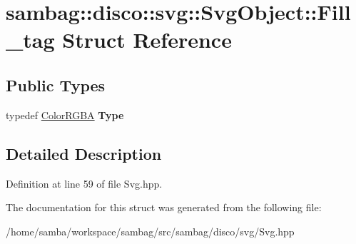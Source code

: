 \hypertarget{structsambag_1_1disco_1_1svg_1_1_svg_object_1_1_fill__tag}{
\section{sambag::disco::svg::SvgObject::Fill\_\-tag Struct Reference}
\label{structsambag_1_1disco_1_1svg_1_1_svg_object_1_1_fill__tag}
}
\subsection*{Public Types}
\begin{DoxyCompactItemize}
\item 
\hypertarget{structsambag_1_1disco_1_1svg_1_1_svg_object_1_1_fill__tag_a66e97b3cad6eaf308ef4e906a0c54366}{
typedef \hyperlink{structsambag_1_1com_1_1_color_r_g_b_a}{ColorRGBA} {\bfseries Type}}
\label{structsambag_1_1disco_1_1svg_1_1_svg_object_1_1_fill__tag_a66e97b3cad6eaf308ef4e906a0c54366}

\end{DoxyCompactItemize}


\subsection{Detailed Description}


Definition at line 59 of file Svg.hpp.



The documentation for this struct was generated from the following file:\begin{DoxyCompactItemize}
\item 
/home/samba/workspace/sambag/src/sambag/disco/svg/Svg.hpp\end{DoxyCompactItemize}
